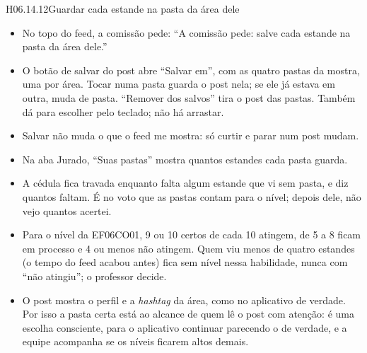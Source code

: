\begin{historia}{H06.14.12}{Guardar cada estande na pasta da área dele}{\parcial}
\aceite
\begin{itemize}
  \item No topo do feed, a comissão pede: \enquote{A comissão pede: salve cada
    estande na pasta da área dele.}
  \item O botão de salvar do post abre \enquote{Salvar em}, com as quatro
    pastas da mostra, uma por área. Tocar numa pasta guarda o post nela; se
    ele já estava em outra, muda de pasta. \enquote{Remover dos salvos} tira
    o post das pastas. Também dá para escolher pelo teclado; não há arrastar.
  \item Salvar não muda o que o feed me mostra: só curtir e parar num post
    mudam.
  \item Na aba Jurado, \enquote{Suas pastas} mostra quantos estandes cada pasta
    guarda.
  \item A cédula fica travada enquanto falta algum estande que vi sem pasta, e
    diz quantos faltam. É no voto que as pastas contam para o nível; depois
    dele, não vejo quantos acertei.
  \item Para o nível da EF06CO01, 9 ou 10 certos de cada 10 atingem, de 5 a 8
    ficam em processo e 4 ou menos não atingem. Quem viu menos de quatro
    estandes (o tempo do feed acabou antes) fica sem nível nessa habilidade,
    nunca com \enquote{não atingiu}; o professor decide.
  \item O post mostra o perfil e a \emph{hashtag} da área, como no aplicativo
    de verdade. Por isso a pasta certa está ao alcance de quem lê o post com
    atenção: é uma escolha consciente, para o aplicativo continuar parecendo
    o de verdade, e a equipe acompanha se os níveis ficarem altos demais.
\end{itemize}
\end{historia}

